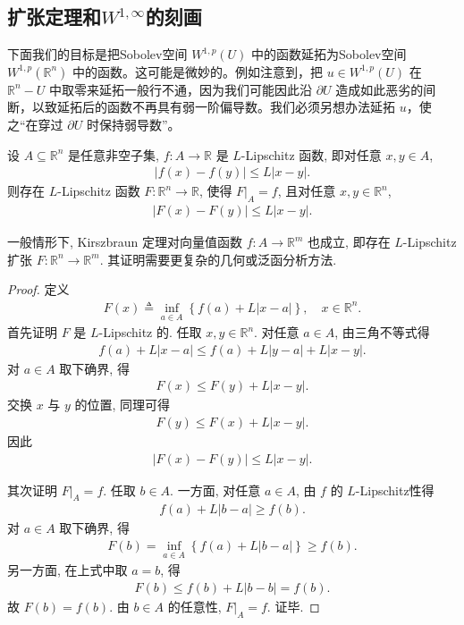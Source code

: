 \documentclass[../../main.tex]{subfiles}
\begin{document}
\subsection{扩张定理和$W^{1,\infty}$的刻画}

下面我们的目标是把Sobolev空间 $W^{1,p}(U)$ 中的函数延拓为Sobolev空间 $W^{1,p}(\mathbb{R}^{n})$ 中的函数。这可能是微妙的。例如注意到，把 $u\in W^{1,p}(U)$ 在 $\mathbb{R}^{n}-U$ 中取零来延拓一般行不通，因为我们可能因此沿 $\partial U$ 造成如此恶劣的间断，以致延拓后的函数不再具有弱一阶偏导数。我们必须另想办法延拓 $u$，使之“在穿过 $\partial U$ 时保持弱导数”。

\begin{theorem}\label{theorem:实值-Kirszbraun扩张定理}
设 $A\subseteq\mathbb{R}^n$ 是任意非空子集, $f:A\to\mathbb{R}$ 是 $L$-Lipschitz 函数, 即对任意 $x,y\in A$,
\begin{align*}
|f(x)-f(y)|\leqslant L|x-y|.
\end{align*}
则存在 $L$-Lipschitz 函数 $F:\mathbb{R}^n\to\mathbb{R}$, 使得 $F|_A=f$, 且对任意 $x,y\in\mathbb{R}^n$,
\begin{align*}
|F(x)-F(y)|\leqslant L|x-y|.
\end{align*}
\end{theorem}
\begin{remark}
一般情形下, Kirszbraun 定理对向量值函数 $f:A\to\mathbb{R}^m$ 也成立, 即存在 $L$-Lipschitz 扩张 $F:\mathbb{R}^n\to\mathbb{R}^m$. 其证明需要更复杂的几何或泛函分析方法.
\end{remark}
\begin{proof}

定义
\begin{align*}
F(x)\triangleq\inf\limits_{a\in A}\left\{f(a)+L|x-a|\right\},\quad x\in\mathbb{R}^n.
\end{align*}
首先证明 $F$ 是 $L$-Lipschitz 的. 任取 $x,y\in\mathbb{R}^n$. 对任意 $a\in A$, 由三角不等式得
\begin{align*}
f(a)+L|x-a|\leqslant f(a)+L|y-a|+L|x-y|.
\end{align*}
对 $a\in A$ 取下确界, 得
\begin{align*}
F(x)\leqslant F(y)+L|x-y|.
\end{align*}
交换 $x$ 与 $y$ 的位置, 同理可得
\begin{align*}
F(y)\leqslant F(x)+L|x-y|.
\end{align*}
因此
\begin{align*}
|F(x)-F(y)|\leqslant L|x-y|.
\end{align*}

其次证明 $F|_A=f$. 任取 $b\in A$. 一方面, 对任意 $a\in A$, 由 $f$ 的 $L$-Lipschitz性得
\begin{align*}
f(a)+L|b-a|\geqslant f(b).
\end{align*}
对 $a\in A$ 取下确界, 得
\begin{align*}
F(b)=\inf\limits_{a\in A}\left\{f(a)+L|b-a|\right\}\geqslant f(b).
\end{align*}
另一方面, 在上式中取 $a=b$, 得
\begin{align*}
F(b)\leqslant f(b)+L|b-b|=f(b).
\end{align*}
故 $F(b)=f(b)$. 由 $b\in A$ 的任意性, $F|_A=f$. 证毕.
\end{proof}
\end{document}
